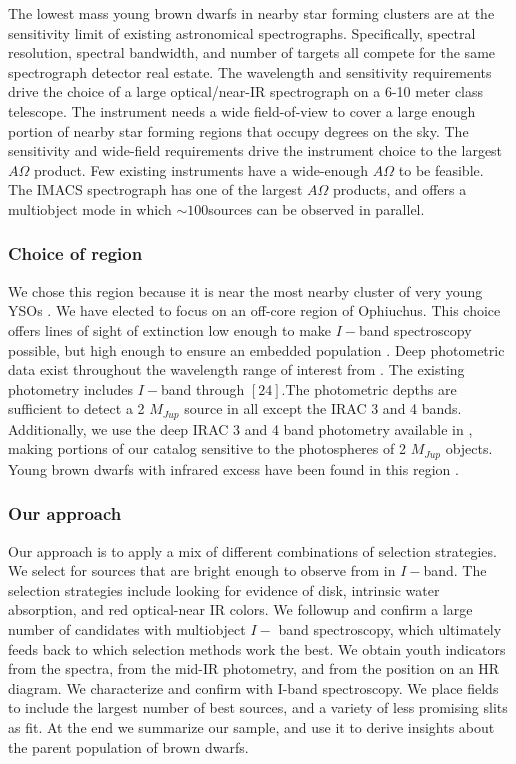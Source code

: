 The lowest mass young brown dwarfs in nearby star forming clusters are at the sensitivity limit of existing astronomical spectrographs.  Specifically, spectral resolution, spectral bandwidth, and number of targets all compete for the same spectrograph detector real estate.  The wavelength and sensitivity requirements drive the choice of a large optical/near-IR spectrograph on a 6-10 meter class telescope.  The instrument needs a wide field-of-view to cover a large enough portion of nearby star forming regions that occupy degrees on the sky.  The sensitivity and wide-field requirements drive the instrument choice to the largest $A\Omega$ product.  Few existing instruments have a wide-enough $A\Omega$ to be feasible.  The IMACS spectrograph has one of the largest $A\Omega$ products, and offers a multiobject mode in which $\sim100$sources can be observed in parallel.  

\subsubsection{Choice of region}
We chose this region because it is near the most nearby cluster of very young YSOs \citep{2008ApJ...675L..29L}.  We have elected to focus on an off-core region of Ophiuchus.  This choice offers lines of sight of extinction low enough to make $I-$band spectroscopy possible, but high enough to ensure an embedded population \cite{2008A&A...489..143L}.  Deep photometric data exist throughout the wavelength range of interest from \citet{allers06}.  The existing \citet{allers06} photometry includes $I-$band through $[24]$.The photometric depths are sufficient to detect a 2 $M_{Jup}$ source in all except the IRAC 3 and 4 bands.   Additionally, we use the deep IRAC 3 and 4 band photometry available in \citet{2010ApJ...720.1374H}, making portions of our catalog sensitive to the photospheres of 2 $M_{Jup}$ objects.  Young brown dwarfs with infrared excess have been found in this region \citep{allers06}.

\subsubsection{Our approach}
Our approach is to apply a mix of different combinations of selection strategies.  We select for sources that are bright enough to observe from in $I-$band.  The selection strategies include looking for evidence of disk, intrinsic water absorption, and red optical-near IR colors.  We followup and confirm a large number of candidates with multiobject $I-$ band spectroscopy, which ultimately feeds back to which selection methods work the best.  We obtain youth indicators from the spectra, from the mid-IR photometry, and from the position on an HR diagram.  We characterize and confirm with I-band spectroscopy.  We place fields to include the largest number of best sources, and a variety of less promising slits as fit.  At the end we summarize our sample, and use it to derive insights about the parent population of brown dwarfs.

